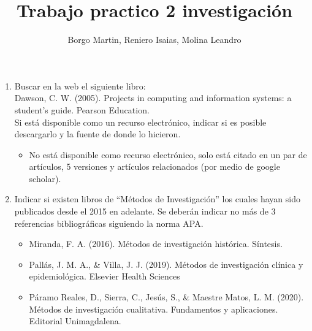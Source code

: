 \documentclass[]{article}
\title{Trabajo practico 2 investigación}
\author{Borgo Martin, Reniero Isaias, Molina Leandro}
\begin{document}
\maketitle
\begin{enumerate}
	\item Buscar en la web el siguiente libro: \\
	Dawson, C. W. (2005). Projects in computing and information systems: a student’s guide. Pearson Education. \\
	Si está disponible como un recurso electrónico, indicar si es posible descargarlo y la fuente de donde lo hicieron.
	\begin{itemize}
		\item No está disponible como recurso electrónico, solo está citado en un par de artículos, 5 versiones y artículos relacionados (por medio de google scholar).
	\end{itemize}
	
	\item Indicar si existen libros de “Métodos de Investigación” los cuales hayan sido publicados desde el 2015 en adelante. Se deberán indicar no más de 3 referencias bibliográficas siguiendo la norma APA.
	\begin{itemize}
		\item Miranda, F. A. (2016). Métodos de investigación histórica. Síntesis.
		\item Pallás, J. M. A., \& Villa, J. J. (2019). Métodos de investigación clínica y epidemiológica. Elsevier Health Sciences
		\item Páramo Reales, D., Sierra, C., Jesús, S., \& Maestre Matos, L. M. (2020). Métodos de investigación cualitativa. Fundamentos y aplicaciones. Editorial Unimagdalena.
	\end{itemize}
	

\end{enumerate}
\end{document}
